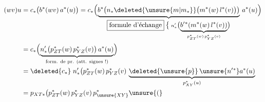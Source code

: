 
\[
\begin{aligned}
(wv)u&=c_*\bigl(b^*(wv)\,a^*(u)\bigr)=c_*\Bigl(\underbrace{b^*\bigl(n_*\deleted{\unsure{m|m_*}}\bigl(m^*(w)\,l^*(v)\bigr)\bigr)}_{\substack{\boxed{\text{formule d'échange}}\;\bigl\{\;n'_*\bigl(\underbrace{b'{}^*(m^*(w)\,l^*(v))}_{p_{ZT}^*(w)\,p_{YZ}^*(v)}\bigr)}}\,a^*(u)\Bigr)\\
&=c_*\Bigl(\underbrace{n'_*\bigl(p_{ZT}^*(w)\,p_{YZ}^*(v)\bigr)\,a^*(u)}_{\text{form. de pr. (att. signes !)}}\Bigr)\\
&=\deleted{c_*}\;n'_*\bigl(p_{ZT}^*(w)\,p_{YZ}^*(v)\,\underbrace{\deleted{\unsure{p}}\,\unsure{n'{}^*}a^*(u)}_{p_{XY}^*(u)}\\
&=p_{XT*}\bigl(p_{ZT}^*(w)\,p_{YZ}^*(v)\,p_{\unsure{XY}}^{*}\unsure{(}
\end{aligned}
\]

